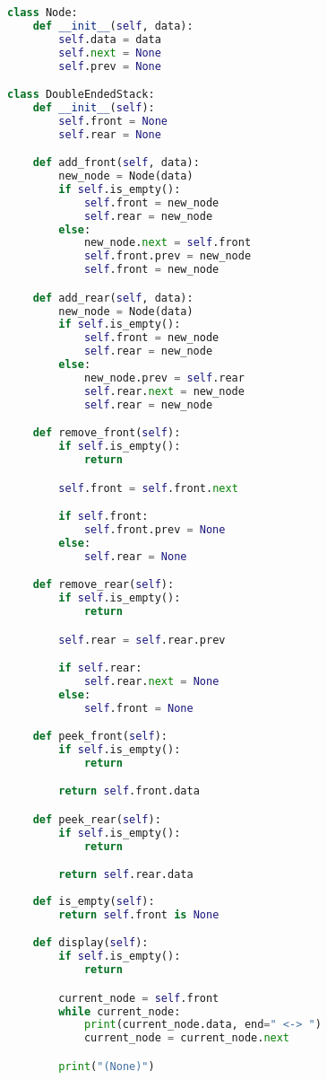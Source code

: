 \begin{lstlisting}[language=Python]
class Node:
    def __init__(self, data):
        self.data = data
        self.next = None
        self.prev = None

class DoubleEndedStack:
    def __init__(self):
        self.front = None
        self.rear = None

    def add_front(self, data):
        new_node = Node(data)
        if self.is_empty():
            self.front = new_node
            self.rear = new_node
        else:
            new_node.next = self.front
            self.front.prev = new_node
            self.front = new_node

    def add_rear(self, data):
        new_node = Node(data)
        if self.is_empty():
            self.front = new_node
            self.rear = new_node
        else:
            new_node.prev = self.rear
            self.rear.next = new_node
            self.rear = new_node

    def remove_front(self):
        if self.is_empty():
            return

        self.front = self.front.next

        if self.front:
            self.front.prev = None
        else:
            self.rear = None

    def remove_rear(self):
        if self.is_empty():
            return

        self.rear = self.rear.prev

        if self.rear:
            self.rear.next = None
        else:
            self.front = None

    def peek_front(self):
        if self.is_empty():
            return

        return self.front.data

    def peek_rear(self):
        if self.is_empty():
            return

        return self.rear.data
    
    def is_empty(self):
        return self.front is None

    def display(self):
        if self.is_empty():
            return

        current_node = self.front
        while current_node:
            print(current_node.data, end=" <-> ")
            current_node = current_node.next

        print("(None)")
\end{lstlisting}

\newpage


